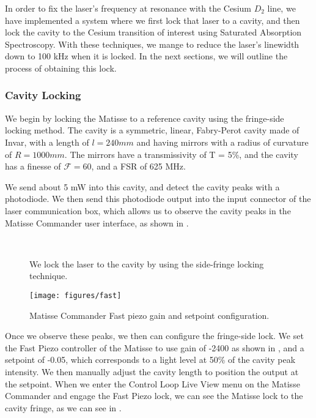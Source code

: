 In order to fix the laser's frequency at resonance with the Cesium $D_2$ line,
we have implemented a system where we first lock that laser to a cavity, and
then lock the cavity to the Cesium transition of interest using Saturated
Absorption Spectroscopy.  With these techniques, we mange to reduce the
laser's linewidth down to 100 kHz when it is locked.  In the next sections, we will outline the process of obtaining this lock.

\subsubsection{Cavity Locking}

We begin by locking the Matisse to a reference cavity using the fringe-side locking method.  The cavity is a symmetric, linear, Fabry-Perot cavity made of Invar, with a length of $l = 240 mm$ and having mirrors with a radius of curvature of $R = 1000 mm$.  The mirrors have a transmissivity of T = 5\%, and the cavity has a finesse of $\mathcal{F} = 60$, and a FSR of 625 MHz.  

We send about 5 mW into this cavity, and detect the cavity peaks with a photodiode.  We then send this photodiode output into the input connector of the laser communication box, which allows us to observe the cavity peaks in the Matisse Commander user interface, as shown in .

\begin{figure}[!ht]
  \centering
   \\
  \caption[Matisse Commander fast piezo]{We lock the laser to the cavity by using the side-fringe locking technique.}
  \label{fig:mc}
\end{figure}

\begin{figure}[!ht] 
 \centering 
\hspace{12em}
 \texttt{[image: figures/fast]} 
 \caption[]{Matisse Commander Fast piezo gain and setpoint configuration.} 
 \label{fig:fast} 
\end{figure}

Once we observe these peaks, we then can configure the fringe-side lock.  We set the Fast Piezo controller of the Matisse to use gain of -2400 as shown in , and a setpoint of -0.05, which corresponds to a light level at 50\% of the cavity peak intensity.  We then manually adjust the cavity length to position the output at the setpoint.  When we enter the Control Loop Live View menu on the Matisse Commander and engage the Fast Piezo lock, we can see the Matisse lock to the cavity fringe, as we can see in .

